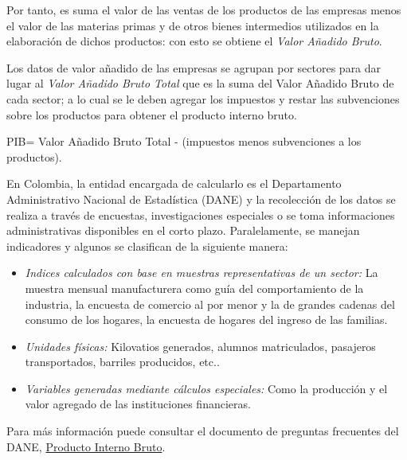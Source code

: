 \documentclass[
  11pt,
]{book}
\begin{document}
Por tanto, es suma el valor de las ventas de los productos de las empresas menos el valor de las materias primas y de otros bienes intermedios utilizados en la elaboración de dichos productos: con esto se obtiene el \emph{Valor Añadido Bruto}.

Los datos de valor añadido de las empresas se agrupan por sectores para dar lugar al \emph{Valor Añadido Bruto Total} que es la suma del Valor Añadido Bruto de cada sector; a lo cual se le deben agregar los impuestos y restar las subvenciones sobre los productos para obtener el producto interno bruto.

PIB= Valor Añadido Bruto Total - (impuestos menos subvenciones a los productos).

En Colombia, la entidad encargada de calcularlo es el Departamento Administrativo Nacional de Estadística (DANE) y la recolección de los datos se realiza a través de encuestas, investigaciones especiales o se toma informaciones administrativas disponibles en el corto plazo. Paralelamente, se manejan indicadores y algunos se clasifican de la siguiente manera:

\begin{itemize}
\item
  \emph{Indices calculados con base en muestras representativas de un sector:} La muestra mensual manufacturera como guía del comportamiento de la industria, la encuesta de comercio al por menor y la de grandes cadenas del consumo de los hogares, la encuesta de hogares del ingreso de las familias.
\item
  \emph{Unidades físicas:} Kilovatios generados, alumnos matriculados, pasajeros transportados, barriles producidos, etc..
\item
  \emph{Variables generadas mediante cálculos especiales:} Como la producción y el valor agregado de las instituciones financieras.
\end{itemize}

Para más información puede consultar el documento de preguntas frecuentes del DANE, \href{https://www.dane.gov.co/files/faqs/faq_pib.pdf}{Producto Interno Bruto}.
\end{document}

